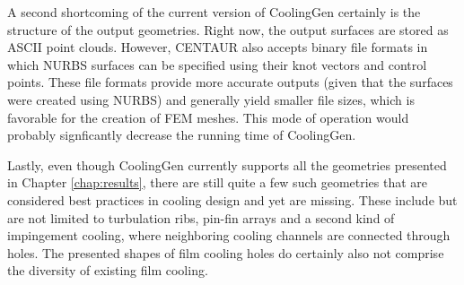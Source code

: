 \documentclass[a4paper, 11pt]{report}
\theoremstyle{definition}
\begin{document}
		A second shortcoming of the current version of CoolingGen certainly is the structure of the output geometries. Right now, the output surfaces are stored as ASCII point clouds. However, CENTAUR also accepts binary file formats in which NURBS surfaces can be specified using their knot vectors and control points. These file formats provide more accurate outputs (given that the surfaces were created using NURBS) and generally yield smaller file sizes, which is favorable for the creation of FEM meshes. This mode of operation would probably signficantly decrease the running time of CoolingGen.

		Lastly, even though CoolingGen currently supports all the geometries presented in Chapter \ref{chap:results}, there are still quite a few such geometries that are considered best practices in cooling design and yet are missing. These include but are not limited to turbulation ribs, pin-fin arrays and a second kind of impingement cooling, where neighboring cooling channels are connected through holes. The presented shapes of film cooling holes do certainly also not comprise the diversity of existing film cooling.

\printbibliography[heading=bibnumbered, title=References]
\end{document}
